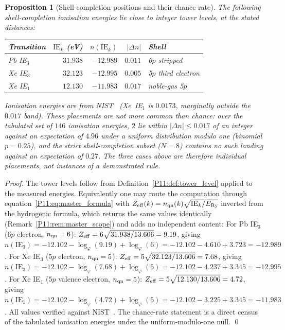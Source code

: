 \documentclass[11pt,a4paper]{article}
\newtheorem{proposition}[theorem]{Proposition}
\theoremstyle{definition}
\theoremstyle{remark}
\newcommand{\vp}{\varphi}
\newcommand{\ERy}{E_{\mathrm{Ry}}}
\newcommand{\nlvl}[1]{n\!\left(#1\right)}
\newcommand{\IE}{\mathrm{IE}}
\begin{document}
\begin{proposition}[Shell-completion positions and their chance rate]
\label{P11:prop:shell_completion}
The following shell-completion ionisation energies lie close to
integer tower levels, at the stated distances:
\begin{center}
\begin{tabular}{lrrrl}
\toprule
Transition & $\IE_k$ (eV) & $\nlvl{\IE_k}$ & $|\Delta n|$ & Shell \\
\midrule
Pb  IE$_3$   & $31.938$ & $-12.989$ & $0.011$ & 6$p$ stripped \\
Xe  IE$_3$   & $32.123$ & $-12.995$ & $0.005$ & 5$p$ third electron \\
Xe  IE$_1$   & $12.130$ & $-11.983$ & $0.017$ & noble-gas 5$p$ \\
\bottomrule
\end{tabular}
\end{center}
Ionisation energies are from NIST~\cite{NIST_ASD}
(Xe~IE$_1$ is $0.0173$, marginally outside the $0.017$ band).
These placements are not more common than chance: over the tabulated
set of $146$ ionisation energies, $2$ lie within $|\Delta n|\leq0.017$
of an integer against an expectation of $4.96$ under a uniform
distribution modulo one (binomial $p=0.25$), and the strict
shell-completion subset ($N=8$) contains no such landing against an
expectation of $0.27$.  The three cases above are therefore individual
placements, not instances of a demonstrated rule.
\end{proposition}

\begin{proof}
The tower levels follow from Definition~\ref{P11:def:tower_level}
applied to the measured energies.  Equivalently one may route the
computation through equation~\eqref{P11:eq:master_formula} with
$Z_{\rm eff}(k)=n_{\rm qn}(k)\sqrt{\IE_k/\ERy}$ inverted from the
hydrogenic formula, which returns the same values identically
(Remark~\ref{P11:rem:master_scope}) and adds no independent content:
For Pb IE$_3$ ($6p$ electron, $n_{\rm qn}=6$):
$Z_{\rm eff}=6\sqrt{31.938/13.606}=9.19$, giving
$\nlvl{\IE_3}=-12.102-\log_\vp(9.19)+\log_\vp(6)
=-12.102-4.610+3.723=-12.989$.
For Xe IE$_3$ ($5p$ electron, $n_{\rm qn}=5$):
$Z_{\rm eff}=5\sqrt{32.123/13.606}=7.68$, giving
$\nlvl{\IE_3}=-12.102-\log_\vp(7.68)+\log_\vp(5)
=-12.102-4.237+3.345=-12.995$.
For Xe IE$_1$ ($5p$ valence electron, $n_{\rm qn}=5$):
$Z_{\rm eff}=5\sqrt{12.130/13.606}=4.72$, giving
$\nlvl{\IE_1}=-12.102-\log_\vp(4.72)+\log_\vp(5)
=-12.102-3.225+3.345=-11.983$.
All values verified against NIST~\cite{NIST_ASD}.
The chance-rate statement is a direct census of the tabulated
ionisation energies under the uniform-modulo-one null.
\qed
\end{proof}
\end{document}
